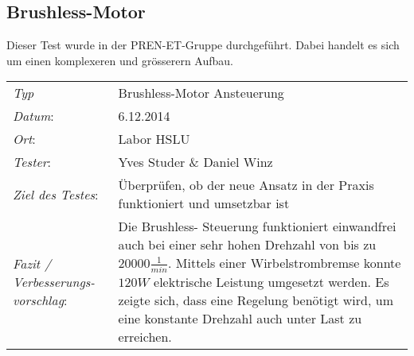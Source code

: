 \subsection{Brushless-Motor}
	Dieser Test wurde in der PREN-ET-Gruppe durchgeführt. Dabei handelt es sich um 
	einen komplexeren und grösserern Aufbau.\\

\begin{tabular}{p{3.6cm}p{9.4cm}}
\rule{0pt}{11pt}\textit{Typ}              & Brushless-Motor Ansteuerung \\ 
\rule{0pt}{11pt}\textit{Datum}:           & 6.12.2014   \\
\rule{0pt}{11pt}\textit{Ort}:             & Labor HSLU \\
\rule{0pt}{11pt}\textit{Tester}:          & Yves Studer \& Daniel Winz \\
\rule{0pt}{11pt}\textit{Ziel des Testes}: & Überprüfen, ob der neue Ansatz in der 
Praxis funktioniert und umsetzbar ist\\
\rule{0pt}{11pt}\textit{Fazit / Verbesserungs-\newline vorschlag}: & Die Brushless-
Steuerung funktioniert einwandfrei auch bei einer sehr hohen Drehzahl von bis zu 
$20000\frac{1}{min}$. Mittels einer Wirbelstrombremse konnte $120 W$ elektrische 
Leistung umgesetzt werden. Es zeigte sich, dass eine Regelung benötigt wird, um 
eine konstante Drehzahl auch unter Last zu erreichen.
\end{tabular}
    